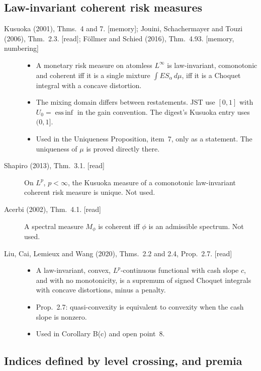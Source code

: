 \subsection{Law-invariant coherent risk measures}

\begin{description}
\item[Kusuoka (2001), Thms.~4 and 7. {[memory]}; Jouini, Schachermayer and Touzi (2006), Thm.~2.3. {[read]}; F\"ollmer and Schied (2016), Thm.~4.93. {[memory, numbering]}]
  \begin{itemize}
  \item A monetary risk measure on atomless $L^\infty$ is law-invariant, comonotonic and coherent iff it is a single mixture $\int ES_\alpha\,d\mu$, iff it is a Choquet integral with a concave distortion.
  \item The mixing domain differs between restatements. JST use $[0,1]$ with $U_0=\operatorname{ess\,inf}$ in the gain convention. The digest's Kusuoka entry uses $(0,1]$.
  \item Used in the Uniqueness Proposition, item~7, only as a statement. The uniqueness of $\mu$ is proved directly there.
  \end{itemize}
\item[Shapiro (2013), Thm.~3.1. {[read]}] On $L^p$, $p<\infty$, the Kusuoka measure of a comonotonic law-invariant coherent risk measure is unique. Not used.
\item[Acerbi (2002), Thm.~4.1. {[read]}] A spectral measure $M_\phi$ is coherent iff $\phi$ is an admissible spectrum. Not used.
\item[Liu, Cai, Lemieux and Wang (2020), Thms.~2.2 and 2.4, Prop.~2.7. {[read]}]
  \begin{itemize}
  \item A law-invariant, convex, $L^p$-continuous functional with cash slope $c$, and with no monotonicity, is a supremum of signed Choquet integrals with concave distortions, minus a penalty.
  \item Prop.~2.7: quasi-convexity is equivalent to convexity when the cash slope is nonzero.
  \item Used in Corollary B(c) and open point~8.
  \end{itemize}
\end{description}

\subsection{Indices defined by level crossing, and premia}


